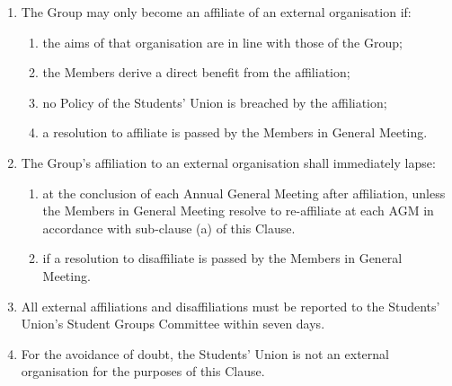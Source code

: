 \documentclass[12pt]{constitution}
\begin{document}

\label{clause:affiliation-external-organisations}

\begin{enumerate}
    \item The Group may only become an affiliate of an external organisation if:
    \begin{enumerate}
        \item the aims of that organisation are in line with those of the Group;
        \item the Members derive a direct benefit from the affiliation;
        \item no Policy of the Students' Union is breached by the affiliation;
        \item a resolution to affiliate is passed by the Members in General Meeting.
    \end{enumerate}

    \item The Group's affiliation to an external organisation shall immediately lapse:
    \begin{enumerate}
        \item at the conclusion of each Annual General Meeting after affiliation, unless the Members in General Meeting resolve to re-affiliate at each AGM in accordance with sub-clause (a) of this Clause.
        \item if a resolution to disaffiliate is passed by the Members in General Meeting.
    \end{enumerate}

    \item All external affiliations and disaffiliations must be reported to the Students' Union's Student Groups Committee within seven days.
    \item For the avoidance of doubt, the Students' Union is not an external organisation for the purposes of this Clause.
\end{enumerate}


\label{clause:amendment-constitution}
\end{document}
